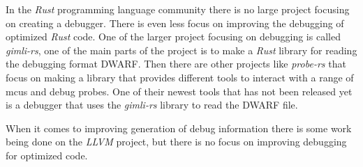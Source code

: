 

In the \emph{Rust} programming language community there is no large project focusing on creating a debugger.
There is even less focus on improving the debugging of optimized \emph{Rust} code.
One of the larger project focusing on debugging is called \emph{gimli-rs}, one of the main parts of the project is to make a \emph{Rust} library for reading the debugging format \gls{DWARF}.
Then there are other projects like \emph{probe-rs} that focus on making a library that provides different tools to interact with a range of \glspl{mcu} and debug probes.
One of their newest tools that has not been released yet is a debugger that uses the \emph{gimli-rs} library to read the \gls{DWARF} file.


When it comes to improving generation of debug information there is some work being done on the \emph{LLVM} project, but there is no focus on improving debugging for optimized code.

